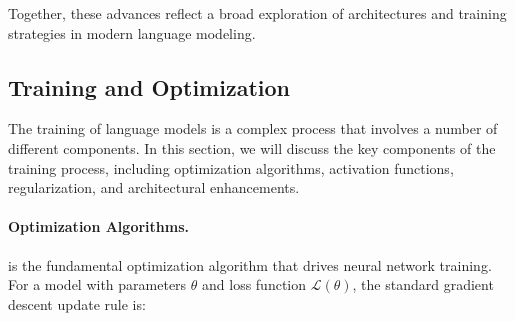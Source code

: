 Together, these advances reflect a broad exploration of architectures and training strategies in modern language modeling.



\subsection{Training and Optimization}
\label{sec:optimization}

The training of language models is a complex process that involves a number of different components. In this section, we will discuss the key components of the training process, including optimization algorithms, activation functions, regularization, and architectural enhancements.

\paragraph{Optimization Algorithms.} 

 is the fundamental optimization algorithm that drives neural network training. For a model with parameters $\theta$ and loss function $\mathcal{L}(\theta)$, the standard gradient descent update rule is:

